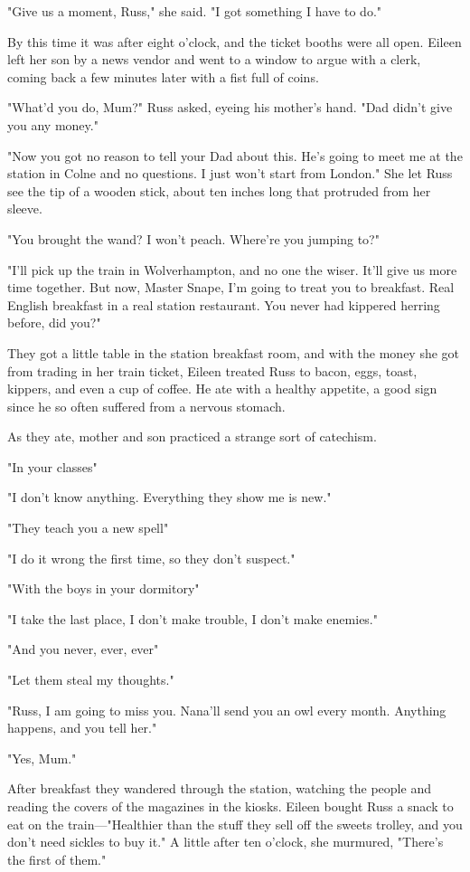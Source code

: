 "Give us a moment, Russ," she said. "I got something I have to do."

By this time it was after eight o'clock, and the ticket booths were all open. Eileen left her son by a news vendor and went to a window to argue with a clerk, coming back a few minutes later with a fist full of coins.

"What'd you do, Mum?" Russ asked, eyeing his mother's hand. "Dad didn't give you any money."

"Now you got no reason to tell your Dad about this. He's going to meet me at the station in Colne and no questions. I just won't start from London." She let Russ see the tip of a wooden stick, about ten inches long that protruded from her sleeve.

"You brought the wand? I won't peach. Where're you jumping to?"

"I'll pick up the train in Wolverhampton, and no one the wiser. It'll give us more time together. But now, Master Snape, I'm going to treat you to breakfast. Real English breakfast in a real station restaurant. You never had kippered herring before, did you?"

They got a little table in the station breakfast room, and with the money she got from trading in her train ticket, Eileen treated Russ to bacon, eggs, toast, kippers, and even a cup of coffee. He ate with a healthy appetite, a good sign since he so often suffered from a nervous stomach.

As they ate, mother and son practiced a strange sort of catechism.

"In your classes{\el}"

"I don't know anything. Everything they show me is new."

"They teach you a new spell{\el}"

"I do it wrong the first time, so they don't suspect."

"With the boys in your dormitory{\el}"

"I take the last place, I don't make trouble, I don't make enemies."

"And you never, ever, ever{\el}"

"Let them steal my thoughts."

"Russ, I am going to miss you. Nana'll send you an owl every month. Anything happens, and you tell her."

"Yes, Mum."

After breakfast they wandered through the station, watching the people and reading the covers of the magazines in the kiosks. Eileen bought Russ a snack to eat on the train—"Healthier than the stuff they sell off the sweets trolley, and you don't need sickles to buy it." A little after ten o'clock, she murmured, "There's the first of them."

